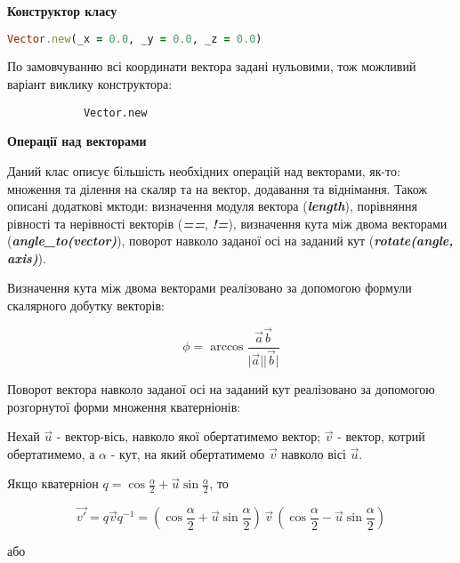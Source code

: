 \documentclass[simple,a4paper,14pt,ukrainian,utf8]{eskdtext}
\newcommand{\abs}[1]{\lvert#1\rvert} %
\begin{document}
            \textbf{Конструктор класу}

            \begin{lstlisting}[language=Ruby]
            Vector.new(_x = 0.0, _y = 0.0, _z = 0.0)
            \end{lstlisting}

            По замовчуванню всі координати вектора задані нульовими, тож можливий варіант виклику конструктора:

            \begin{lstlisting}
            Vector.new
            \end{lstlisting}

            \textbf{Операції над векторами}

            Даний клас описує більшість необхідних операцій над векторами, як-то: множення та ділення на скаляр та на вектор, додавання та віднімання. Також описані додаткові мктоди: визначення модуля вектора (\textit{\textbf{length}}), порівняння рівності та нерівності векторів (\textit{\textbf{==}}, \textit{\textbf{!=}}), визначення кута між двома векторами (\textit{\textbf{angle\_to(vector)}}), поворот навколо заданої осі на заданий кут (\textit{\textbf{rotate(angle, axis)}}).

            Визначення кута між двома векторами реалізовано за допомогою формули скалярного добутку векторів:

            $$ \phi = \arccos \frac{\vec{a}\vec{b}}{\abs{\vec{a}}\abs{\vec{b}}} $$

            Поворот вектора навколо заданої осі на заданий кут реалізовано за допомогою розгорнутої форми множення кватерніонів:


            Нехай $\vec{u}$ - вектор-вісь, навколо якої обертатимемо вектор; $\vec{v}$ - вектор, котрий обертатимемо, а $\alpha$ - кут, на який обертатимемо $\vec{v}$ навколо вісі $\vec{u}$.

            Якщо кватерніон $ q = \cos \frac{\alpha}{2} + \vec{u} \sin \frac{\alpha}{2} $, то

            $$ \vec{v'} = q \vec{v} q^{-1} = \left( \cos \frac{\alpha}{2} + \vec{u} \sin \frac{\alpha}{2} \right) \, \vec{v} \, \left( \cos \frac{\alpha}{2} - \vec{u} \sin \frac{\alpha}{2} \right) $$

            або
\end{document}

